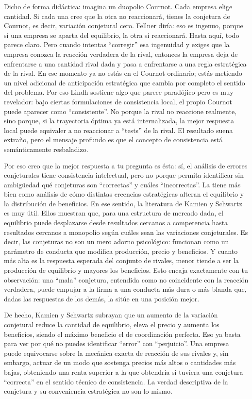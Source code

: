 \documentclass[10pt,a4paper]{article}
\begin{document}
Dicho de forma didáctica: imagina un duopolio Cournot. Cada empresa elige cantidad. Si cada una cree que la otra no reaccionará, tienes la conjetura de Cournot, es decir, variación conjetural cero. Fellner diría: eso es ingenuo, porque si una empresa se aparta del equilibrio, la otra sí reaccionará. Hasta aquí, todo parece claro. Pero cuando intentas “corregir” esa ingenuidad y exiges que la empresa conozca la reacción verdadera de la rival, entonces la empresa deja de enfrentarse a una cantidad rival dada y pasa a enfrentarse a una regla estratégica de la rival. En ese momento ya no estás en el Cournot ordinario; estás metiendo un nivel adicional de anticipación estratégica que cambia por completo el sentido del problema. Por eso Lindh sostiene algo que parece paradójico pero es muy revelador: bajo ciertas formulaciones de consistencia local, el propio Cournot puede aparecer como “consistente”. No porque la rival no reaccione realmente, sino porque, si la trayectoria óptima ya está internalizada, la mejor respuesta local puede equivaler a no reaccionar a “tests” de la rival. El resultado suena extraño, pero el mensaje profundo es que el concepto de consistencia está semánticamente resbaladizo.

Por eso creo que la mejor respuesta a tu pregunta es ésta: sí, el análisis de errores conjeturales tiene consistencia intelectual, pero no porque permita identificar sin ambigüedad qué conjeturas son “correctas” y cuáles “incorrectas”. La tiene más bien como análisis de cómo distintas creencias estratégicas alteran el equilibrio y la distribución de beneficios. En ese sentido, la literatura de Kamien y Schwartz es muy útil. Ellos muestran que, para una estructura de mercado dada, el equilibrio puede desplazarse desde resultados cercanos a competencia hasta resultados cercanos a monopolio según cuáles sean las variaciones conjeturales. Es decir, las conjeturas no son un mero adorno psicológico: funcionan como un parámetro de conducta que modifica producción, precio y beneficios. Y cuanto más alta es la respuesta esperada del conjunto de rivales, menor tiende a ser la producción de equilibrio y mayores los beneficios. Esto encaja exactamente con tu observación: una “mala” conjetura, entendida como no coincidente con la reacción verdadera, puede empujar a la firma a una conducta más dura o más blanda que, dadas las respuestas de los demás, la sitúe en una posición mejor. 

De hecho, Kamien y Schwartz subrayan que un aumento de la variación conjetural reduce la cantidad de equilibrio, eleva el precio y aumenta los beneficios, siendo el máximo beneficio el de coordinación perfecta. Eso ya basta para ver por qué no puedes identificar “error” con “perjuicio”. Una empresa puede equivocarse sobre la mecánica exacta de reacción de sus rivales y, sin embargo, actuar de un modo que sostenga precios más altos o cantidades más bajas, obteniendo una renta superior a la que obtendría si tuviera una conjetura “correcta” en el sentido técnico de consistencia. La verdad descriptiva de la conjetura y su conveniencia estratégica no son lo mismo. 
\end{document}
